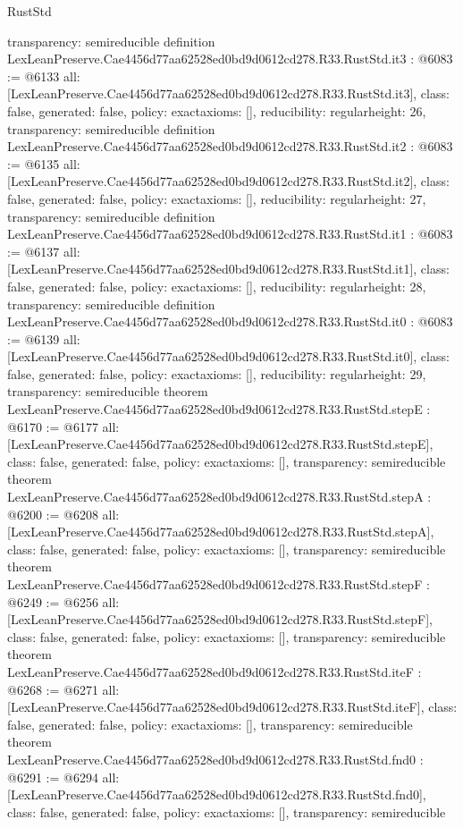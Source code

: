 \begin{lexlean}{RustStd}
\begin{coremodule}
{  transparency: semireducible
}
definition LexLeanPreserve.Cae4456d77aa62528ed0bd9d0612cd278.R33.RustStd.it3 : @6083 := @6133 {
  all: [LexLeanPreserve.Cae4456d77aa62528ed0bd9d0612cd278.R33.RustStd.it3],
  class: false,
  generated: false,
  policy: exact{axioms: []},
  reducibility: regular{height: 26},
  transparency: semireducible
}
definition LexLeanPreserve.Cae4456d77aa62528ed0bd9d0612cd278.R33.RustStd.it2 : @6083 := @6135 {
  all: [LexLeanPreserve.Cae4456d77aa62528ed0bd9d0612cd278.R33.RustStd.it2],
  class: false,
  generated: false,
  policy: exact{axioms: []},
  reducibility: regular{height: 27},
  transparency: semireducible
}
definition LexLeanPreserve.Cae4456d77aa62528ed0bd9d0612cd278.R33.RustStd.it1 : @6083 := @6137 {
  all: [LexLeanPreserve.Cae4456d77aa62528ed0bd9d0612cd278.R33.RustStd.it1],
  class: false,
  generated: false,
  policy: exact{axioms: []},
  reducibility: regular{height: 28},
  transparency: semireducible
}
definition LexLeanPreserve.Cae4456d77aa62528ed0bd9d0612cd278.R33.RustStd.it0 : @6083 := @6139 {
  all: [LexLeanPreserve.Cae4456d77aa62528ed0bd9d0612cd278.R33.RustStd.it0],
  class: false,
  generated: false,
  policy: exact{axioms: []},
  reducibility: regular{height: 29},
  transparency: semireducible
}
theorem LexLeanPreserve.Cae4456d77aa62528ed0bd9d0612cd278.R33.RustStd.stepE : @6170 := @6177 {
  all: [LexLeanPreserve.Cae4456d77aa62528ed0bd9d0612cd278.R33.RustStd.stepE],
  class: false,
  generated: false,
  policy: exact{axioms: []},
  transparency: semireducible
}
theorem LexLeanPreserve.Cae4456d77aa62528ed0bd9d0612cd278.R33.RustStd.stepA : @6200 := @6208 {
  all: [LexLeanPreserve.Cae4456d77aa62528ed0bd9d0612cd278.R33.RustStd.stepA],
  class: false,
  generated: false,
  policy: exact{axioms: []},
  transparency: semireducible
}
theorem LexLeanPreserve.Cae4456d77aa62528ed0bd9d0612cd278.R33.RustStd.stepF : @6249 := @6256 {
  all: [LexLeanPreserve.Cae4456d77aa62528ed0bd9d0612cd278.R33.RustStd.stepF],
  class: false,
  generated: false,
  policy: exact{axioms: []},
  transparency: semireducible
}
theorem LexLeanPreserve.Cae4456d77aa62528ed0bd9d0612cd278.R33.RustStd.iteF : @6268 := @6271 {
  all: [LexLeanPreserve.Cae4456d77aa62528ed0bd9d0612cd278.R33.RustStd.iteF],
  class: false,
  generated: false,
  policy: exact{axioms: []},
  transparency: semireducible
}
theorem LexLeanPreserve.Cae4456d77aa62528ed0bd9d0612cd278.R33.RustStd.fnd0 : @6291 := @6294 {
  all: [LexLeanPreserve.Cae4456d77aa62528ed0bd9d0612cd278.R33.RustStd.fnd0],
  class: false,
  generated: false,
  policy: exact{axioms: []},
  transparency: semireducible
}
\end{coremodule}
\end{lexlean}
